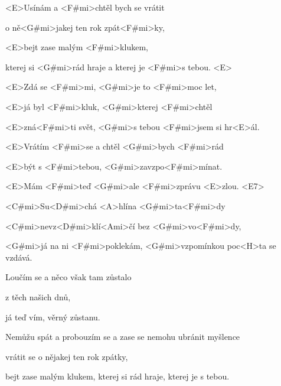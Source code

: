 

\zs
<E>Usínám a <F#mi>chtěl bych se vrátit

o ně<G#mi>jakej ten rok zpát<F#mi>ky,

<E>bejt zase malým <F#mi>klukem,

kterej si <G#mi>rád hraje a kterej je <F#mi>s tebou. <E>
\ks

\zs
<E>Zdá se <F#mi>mi, <G#mi>je to <F#mi>moc let,

<E>já byl <F#mi>kluk, <G#mi>kterej <F#mi>chtěl

<E>zná<F#mi>ti svět, <G#mi>s tebou <F#mi>jsem si hr<E>ál.
\ks

\zs
<E>Vrátím <F#mi>se a chtěl <G#mi>bych <F#mi>rád

<E>být s <F#mi>tebou, <G#mi>zavzpo<F#mi>mínat.

<E>Mám <F#mi>teď <G#mi>ale <F#mi>zprávu <E>zlou. <E7>
\ks

\zr
<C#mi>Su<D#mi>chá <A>hlína <G#mi>ta<F#mi>dy

<C#mi>nevz<D#mi>klí<Ami>čí bez <G#mi>vo<F#mi>dy,

<G#mi>já na ni <F#mi>poklekám, <G#mi>vzpomínkou poc<H>ta se vzdává.
\kr

\zs
Loučím se a něco však tam zůstalo

z těch našich dnů,

já teď vím, věrný zůstanu.
\ks

\zr \kr

\zs
Nemůžu spát a probouzím se a zase se nemohu ubránit myšlence

vrátit se o nějakej ten rok zpátky,

bejt zase malým klukem, kterej si rád hraje, kterej je s tebou.
\ks

\kp
